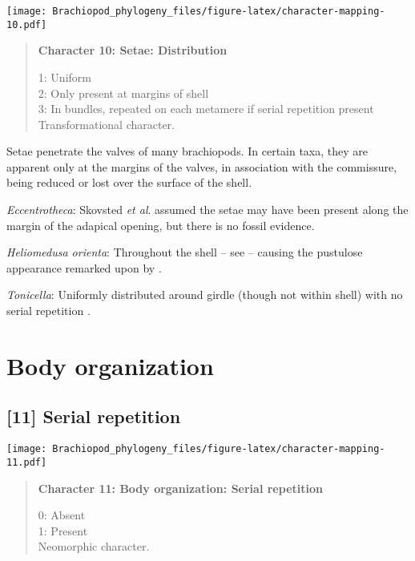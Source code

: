 \documentclass[openany]{book}
\theoremstyle{definition}
\theoremstyle{definition}
\theoremstyle{definition}
\theoremstyle{remark}
\begin{document}
\texttt{[image: Brachiopod\_phylogeny\_files/figure-latex/character-mapping-10.pdf]}

\begin{quote}
\textbf{Character 10: Setae: Distribution}

1: Uniform\\
2: Only present at margins of shell\\
3: In bundles, repeated on each metamere if serial repetition present\\
Transformational character.
\end{quote}

Setae penetrate the valves of many brachiopods. In certain taxa, they
are apparent only at the margins of the valves, in association with the
commissure, being reduced or lost over the surface of the shell.

\hypertarget{Eccentrotheca-coding-10}{}
\emph{Eccentrotheca}: Skovsted \emph{et al}.
\citeyearpar{Skovsted2011Scleritomeconstruction} assumed the setae may
have been present along the margin of the adapical opening, but there is
no fossil evidence.

\hypertarget{Heliomedusa_orienta-coding-10}{}
\emph{Heliomedusa orienta}: Throughout the shell -- see
\citet{Williams2007Supplement} -- causing the pustulose appearance
remarked upon by \citet{Chen2007Reinterpretationof}.

\hypertarget{Tonicella-coding-10}{}
\emph{Tonicella}: Uniformly distributed around girdle (though not within
shell) with no serial repetition \citep{Vinther2005, Leise1988}.

\section{Body organization}\label{body-organization}

\subsection*{{[}11{]} Serial repetition}\label{serial-repetition}

\texttt{[image: Brachiopod\_phylogeny\_files/figure-latex/character-mapping-11.pdf]}

\begin{quote}
\textbf{Character 11: Body organization: Serial repetition}

0: Absent\\
1: Present\\
Neomorphic character.
\end{quote}
\end{document}
